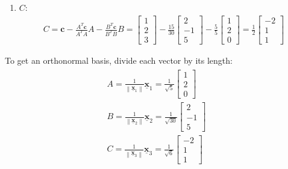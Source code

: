 \documentclass[10pt,a4paper]{article}
\begin{document}
\begin{enumerate}
    \item $C$: 
    \begin{align*}
        C = \textbf{c} - \frac{A^T \textbf{c}}{A^T A} A - \frac{B^T \textbf{c}}{B^T B} B = \left[\begin{array}{l}
            1 \\
            2 \\
            3
            \end{array}\right]-\frac{15}{30}\left[\begin{array}{r}
            2 \\
            -1 \\
            5
            \end{array}\right]-\frac{5}{5}\left[\begin{array}{l}
            1 \\
            2 \\
            0
            \end{array}\right]=\frac{1}{2}\left[\begin{array}{r}
            -2 \\
            1 \\
            1
            \end{array}\right]
    \end{align*}
\end{enumerate}

To get an orthonormal basis, divide each vector by its length:
\begin{align*}
    \begin{array}{l}
        A=\frac{1}{\left\|\underline{\mathbf{x}}_{1}\right\|} \underline{\mathbf{x}}_{1}=\frac{1}{\sqrt{5}}\left[\begin{array}{l}
        1 \\
        2 \\
        0
        \end{array}\right] \\
        B=\frac{1}{\left\|\underline{\mathbf{x}}_{2}\right\|} \underline{\mathbf{x}}_{2}=\frac{1}{\sqrt{30}}\left[\begin{array}{r}
        2 \\
        -1 \\
        5
        \end{array}\right] \\
        C=\frac{1}{\left\|\underline{\mathbf{x}}_{3}\right\|} \underline{\mathbf{x}}_{3}=\frac{1}{\sqrt{6}}\left[\begin{array}{r}
        -2 \\
        1 \\
        1
        \end{array}\right]
    \end{array}
\end{align*}
\end{document}
